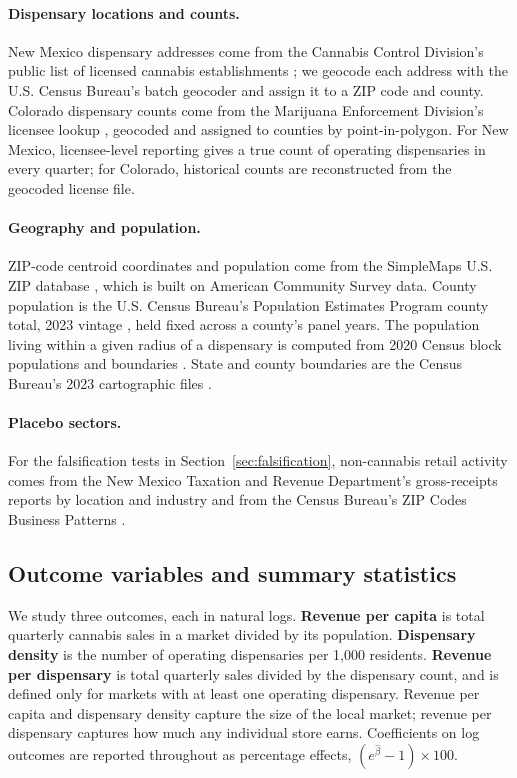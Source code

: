 \paragraph{Dispensary locations and counts.} New Mexico dispensary addresses
come from the Cannabis Control Division's public list of licensed cannabis
establishments \citep{NMCCDLicensees}; we geocode each address with the U.S.
Census Bureau's batch geocoder and assign it to a ZIP code and county. Colorado
dispensary counts come from the Marijuana Enforcement Division's licensee lookup
\citep{COMedLicensees}, geocoded and assigned to counties by point-in-polygon.
For New Mexico, licensee-level reporting gives a true count of operating
dispensaries in every quarter; for Colorado, historical counts are reconstructed
from the geocoded license file.

\paragraph{Geography and population.} ZIP-code centroid coordinates and
population come from the SimpleMaps U.S. ZIP database
\citep{SimpleMapsZIP}, which is built on American Community Survey data. County
population is the U.S. Census Bureau's Population Estimates Program county total,
2023 vintage \citep{CensusPopEst2023}, held fixed across a county's panel years.
The population living within a given radius of a dispensary is computed from
2020 Census block populations and boundaries \citep{CensusBlocks2020}. State and
county boundaries are the Census Bureau's 2023 cartographic files
\citep{CensusCountyShapefile}.

\paragraph{Placebo sectors.} For the falsification tests in
Section~\ref{sec:falsification}, non-cannabis retail activity comes from the
New Mexico Taxation and Revenue Department's gross-receipts reports by location
and industry \citep{NMTRDGrossReceipts} and from the Census Bureau's ZIP Codes
Business Patterns \citep{CensusZBP}.

\subsection{Outcome variables and summary statistics}
\label{sec:summarystats}

We study three outcomes, each in natural logs. \textbf{Revenue per capita} is
total quarterly cannabis sales in a market divided by its population.
\textbf{Dispensary density} is the number of operating dispensaries per 1,000
residents. \textbf{Revenue per dispensary} is total quarterly sales divided by
the dispensary count, and is defined only for markets with at least one
operating dispensary. Revenue per capita and dispensary density capture the size
of the local market; revenue per dispensary captures how much any individual
store earns. Coefficients on log outcomes are reported throughout as percentage
effects, $(e^{\hat\beta}-1)\times 100$.

